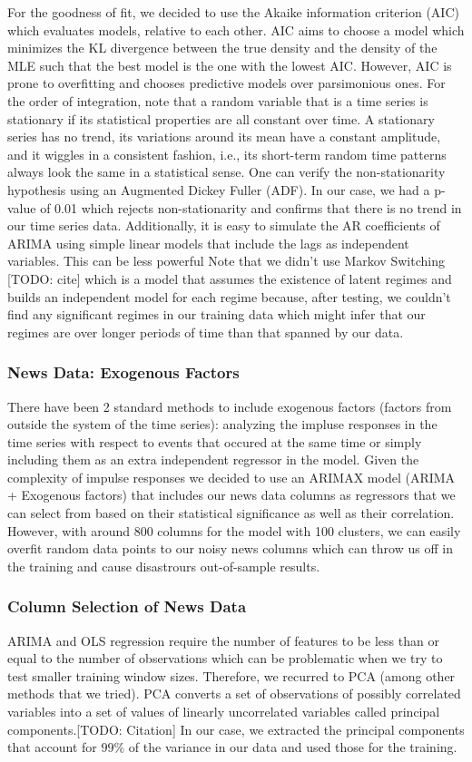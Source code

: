 For the goodness of fit, we decided to use the Akaike information criterion (AIC) which evaluates models, relative to each other. AIC aims to choose a model which minimizes the KL divergence between the true density and the density of the MLE such that the best model is the one with the lowest AIC. However, AIC is prone to overfitting and chooses predictive models over parsimonious ones.
For the order of integration, note that a random variable that is a time series is stationary if its statistical properties are all constant over time.  A stationary series has no trend, its variations around its mean have a constant amplitude, and it wiggles in a consistent fashion, i.e., its short-term random time patterns always look the same in a statistical sense. \cite{tsay, VAR}
One can verify the non-stationarity hypothesis using an Augmented Dickey Fuller (ADF). In our case, we had a p-value of 0.01 which rejects non-stationarity and confirms that there is no trend in our time series data.
Additionally, it is easy to simulate the AR coefficients of ARIMA using simple linear models that include the lags as independent variables. This can be less powerful
Note that we didn't use Markov Switching [TODO: cite] which is a model that assumes the existence of latent regimes and builds an independent model for each regime because, after testing, we couldn't find any significant regimes in our training data which might infer that our regimes are over longer periods of time than that spanned by our data.
\subsubsection{News Data: Exogenous Factors}
There have been 2 standard methods to include exogenous factors (factors from outside the system of the time series): analyzing the impluse responses in the time series with respect to events that occured at the same time or simply including them as an extra independent regressor in the model. Given the complexity of impulse responses we decided to use an ARIMAX model (ARIMA + Exogenous factors) that includes our news data columns as regressors that we can select from based on their statistical significance as well as their correlation.
However, with around 800 columns for the model with 100 clusters, we can easily overfit random data points to our noisy news columns which can throw us off in the training and cause disastrours out-of-sample results.
\subsubsection{Column Selection of News Data}
ARIMA and OLS regression require the number of features to be less than or equal to the number of observations which can be problematic when we try to test smaller training window sizes. Therefore, we recurred to PCA (among other methods that we tried). PCA converts a set of observations of possibly correlated variables into a set of values of linearly uncorrelated variables called principal components.[TODO: Citation] In our case, we extracted the principal components that account for $99\%$ of the variance in our data and used those for the training.
